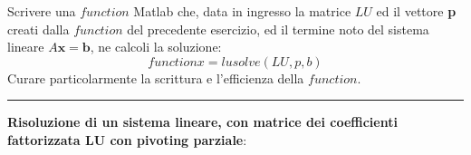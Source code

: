 Scrivere una $function$ Matlab che, data in ingresso la matrice $LU$ ed il vettore \textbf{p} creati dalla $function$ del precedente esercizio, ed il termine noto del sistema lineare $A\textbf{x} = \textbf{b}$, ne calcoli la soluzione:
$$function x = lusolve(LU,p,b)$$
Curare particolarmente la scrittura e l’efficienza della $function$.

\hspace*{\fill}
\par\noindent\rule{\textwidth}{0.4pt}
\hspace*{\fill}

\textbf{Risoluzione di un sistema lineare, con matrice dei coefficienti fattorizzata LU con pivoting parziale}:

